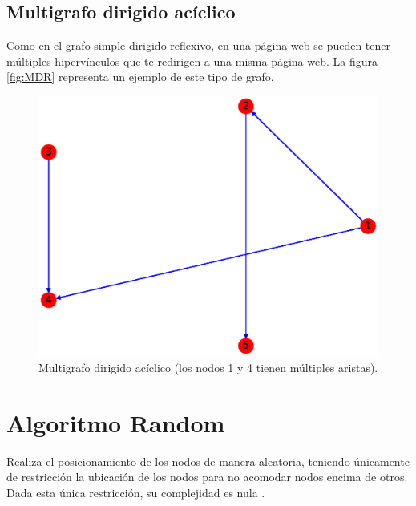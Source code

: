 \documentclass{article}
\begin{document}
\subsection{Multigrafo dirigido acíclico}
Como en el grafo simple dirigido reflexivo, en una página web se pueden tener múltiples hipervínculos que te redirigen a una misma página web. La figura \ref{fig:MDR} representa un ejemplo de este tipo de grafo.
\begin{figure}[H]
    \includegraphics[width=\textwidth]{10-MDA}
    \caption{Multigrafo dirigido acíclico (los nodos 1 y 4 tienen múltiples aristas).}
    \label{fig:MDA}
\end{figure}
\section{Algoritmo Random}
Realiza el posicionamiento de los nodos de manera aleatoria, teniendo únicamente de restricción la ubicación de los nodos para no acomodar nodos encima de otros. Dada esta única restricción, su complejidad es nula \cite{random}.
\end{document}
